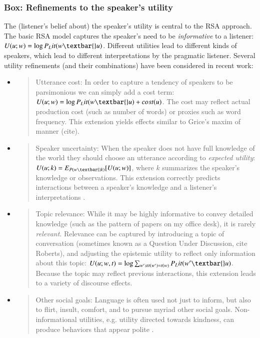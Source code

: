 \documentclass[]{elsarticle}
\begin{document}
\subsubsection{Box: Refinements to the speaker's
utility}\label{box-refinements-to-the-speakers-utility}

The (listener's belief about) the speaker's utility is central to the
RSA approach. The basic RSA model captures the speaker's need to be
\emph{informative} to a listener: $U(u; w) = \log
P_Lit(w\textbar{}u)$. Different utilities lead to different kinds of
speakers, which lead to different interpretations by the pragmatic
listener. Several utility refinements (and their combinations) have been
considered in recent work:

\begin{itemize}
\item
  \begin{quote}
  Utterance cost: In order to capture a tendency of speakers to be
  parsimonious we can simply add a cost term: $U(u; w) =
  \log P_Lit(w\textbar{}u) + cost(u)$. The cost may
  reflect actual production cost (such as number of words) or proxies
  such as word frequency. This extension yields effects similar to
  Grice's maxim of manner (cite).
  \end{quote}
\item
  \begin{quote}
  Speaker uncertainty: When the speaker does not have full knowledge of
  the world they should choose an utterance according to \emph{expected
  utility}: $U(u;k) = E_{P(w\textbar{}k)}{[}U(u;w){]}$, where $k$
  summarizes the speaker's knowledge or observations. This extension
  correctly predicts interactions between a speaker's knowledge and a
  listener's interpretations
  \cite{goodmanstuhllmueler}.
  \end{quote}
\item
  \begin{quote}
  Topic relevance: While it may be highly informative to convey detailed
  knowledge (such as the pattern of papers on my office desk), it is
  rarely \emph{relevant}. Relevance can be captured by introducing a
  topic of conversation (sometimes known as a Question Under Discussion,
  cite Roberts), and adjusting the epistemic utility to reflect only
  information about this topic: $U(u;w,t)=\log \sum_{w' st t(w')=t(w)} P_Lit(w'\textbar{}u)$.
  Because the topic may reflect previous interactions, this extension
  leads to a variety of discourse effects.
  \end{quote}
\item
  \begin{quote}
  Other social goals: Language is often used not just to inform, but
  also to flirt, insult, comfort, and to pursue myriad other social
  goals. Non-informational utilities, e.g. utility directed towards
  kindness, can produce behaviors that appear polite
  \cite{yoon}.
  \end{quote}
\end{itemize}
\end{document}
